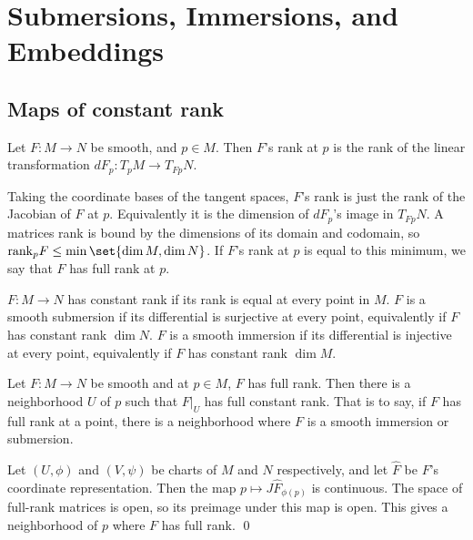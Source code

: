 \section{Submersions, Immersions, and Embeddings}

\subsection{Maps of constant rank}

\bdefn

    Let $F\colon M\to N$ be smooth, and $p\in M$.
    Then $F$'s {\emphcolor rank} at $p$ is the rank of the linear transformation $dF_p\colon T_pM\to T_{Fp}N$.

\edefn

Taking the coordinate bases of the tangent spaces, $F$'s rank is just the rank of the Jacobian of $F$ at $p$.
Equivalently it is the dimension of $dF_p$'s image in $T_{Fp}N$.
A matrices rank is bound by the dimensions of its domain and codomain, so $\rank_p F\leq\min\set{\dim M,\dim N}$.
If $F$'s rank at $p$ is equal to this minimum, we say that $F$ has {\emphcolor full rank} at $p$.

\bdefn

    $F\colon M\to N$ has {\emphcolor constant rank} if its rank is equal at every point in $M$.
    $F$ is a {\emphcolor smooth submersion} if its differential is surjective at every point, equivalently if
    $F$ has constant rank $\dim N$.
    $F$ is a {\emphcolor smooth immersion} if its differential is injective at every point, equivalently if
    $F$ has constant rank $\dim M$.

\edefn

\bprop

    Let $F\colon M\to N$ be smooth and at $p\in M$, $F$ has full rank.
    Then there is a neighborhood $U$ of $p$ such that $F|_U$ has full constant rank.
    That is to say, if $F$ has full rank at a point, there is a neighborhood where $F$ is a smooth immersion or
    submersion.

\eprop

\bproof

    Let $(U,\phi)$ and $(V,\psi)$ be charts of $M$ and $N$ respectively, and let $\hat F$ be $F$'s coordinate representation.
    Then the map $p\mapsto J\hat F_{\phi(p)}$ is continuous.
    The space of full-rank matrices is open, so its preimage under this map is open.
    This gives a neighborhood of $p$ where $F$ has full rank.
    \qed

\eproof

